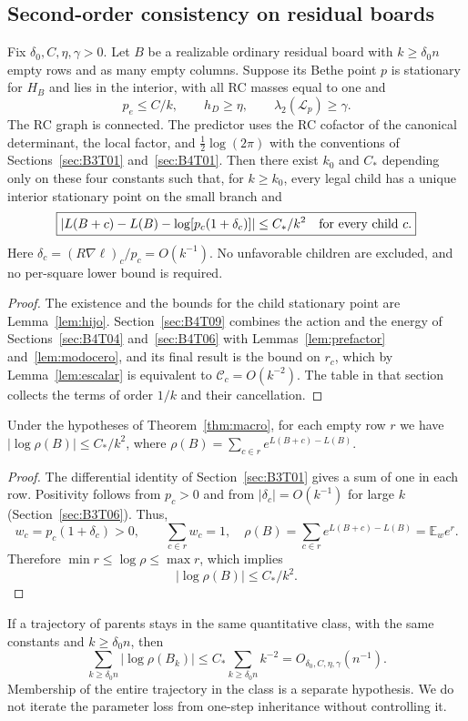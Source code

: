 \subsection{Second-order consistency on residual boards}\label{sec:B4T05}
\begin{teorema}\label{thm:macro}
Fix $\delta_0,C,\eta,\gamma>0$. Let $B$ be a realizable ordinary residual board with $k\ge\delta_0n$ empty
rows and as many empty columns. Suppose its Bethe point $p$ is stationary for $H_B$ and lies in the
interior, with all RC masses equal to one and
\[
 p_e\le C/k,\qquad h_D\ge\eta,\qquad
 \lambda_2(\mathscr L_p)\ge\gamma.
\]
The RC graph is connected. The predictor uses the RC cofactor of the canonical determinant, the local
factor, and $\tfrac12\log(2\pi)$ with the conventions of Sections~\ref{sec:B3T01} and~\ref{sec:B4T01}. Then
there exist $k_0$ and $C_*$ depending only on these four constants such that, for $k\ge k_0$, every legal
child has a unique interior stationary point on the small branch and
\[
 \boxed{\left|L(B+c)-L(B)-\log[p_c(1+\delta_c)]\right|
 \le C_*/k^2\quad\hbox{for every child }c.}
\]
Here $\delta_c=(R\nabla\ell)_c/p_c=O(k^{-1})$. No unfavorable children are excluded, and no per-square lower
bound is required.
\end{teorema}
\begin{proof}
The existence and the bounds for the child stationary point are Lemma~\ref{lem:hijo}.
Section~\ref{sec:B4T09}
combines the action and the energy of Sections~\ref{sec:B4T04} and~\ref{sec:B4T06} with
Lemmas~\ref{lem:prefactor} and~\ref{lem:modocero}, and its final result is the bound on $r_c$, which by
Lemma~\ref{lem:escalar} is equivalent to $\mathcal C_c=O(k^{-2})$. The table in that section collects the
terms of order $1/k$ and their cancellation.
\end{proof}

\begin{corolario}\label{cor:rho}
Under the hypotheses of Theorem~\ref{thm:macro}, for each empty row $r$ we have $|\log\rho(B)|\le C_*/k^2$,
where $\rho(B)=\sum_{c\in r}e^{L(B+c)-L(B)}$.
\end{corolario}
\begin{proof}
The differential identity of Section~\ref{sec:B3T01} gives a sum of one in each row.
Positivity follows from $p_c>0$ and from $|\delta_c|=O(k^{-1})$ for large $k$ (Section~\ref{sec:B3T06}).
Thus,
\[
 w_c=p_c(1+\delta_c)>0,\qquad\sum_{c\in r}w_c=1,
 \quad \rho(B)=\sum_{c\in r}e^{L(B+c)-L(B)}=\mathbb E_w e^r.
\]
Therefore $\min r\le\log\rho\le\max r$, which implies
\[
 \boxed{|\log\rho(B)|\le C_*/k^2.}
\]
\end{proof}
If a trajectory of parents stays in the same quantitative class, with the same constants and
$k\ge\delta_0n$, then
\[
 \sum_{k\ge\delta_0n}|\log\rho(B_k)|\le C_*\sum_{k\ge\delta_0n}k^{-2}
 =O_{\delta_0,C,\eta,\gamma}(n^{-1}).
\]
Membership of the entire trajectory in the class is a separate hypothesis. We do not iterate the parameter
loss from one-step inheritance without controlling it.

